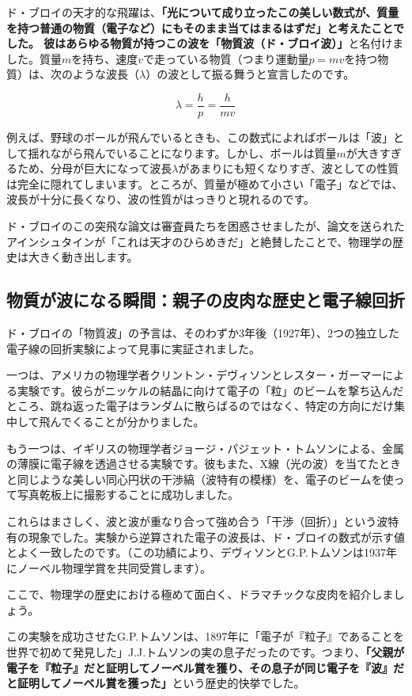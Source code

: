 ド・ブロイの天才的な飛躍は、\textbf{「光について成り立ったこの美しい数式が、質量を持つ普通の物質（電子など）にもそのまま当てはまるはずだ」と考えたことでした。 彼はあらゆる物質が持つこの波を「物質波（ド・ブロイ波）」}と名付けました。質量\(m\)を持ち、速度\(v\)で走っている物質（つまり運動量\(p=mv\)を持つ物質）は、次のような波長（\(\lambda\)）の波として振る舞うと宣言したのです。

\[\lambda = \frac{h}{p} = \frac{h}{mv}\]

例えば、野球のボールが飛んでいるときも、この数式によればボールは「波」として揺れながら飛んでいることになります。しかし、ボールは質量\(m\)が大きすぎるため、分母が巨大になって波長\(\lambda\)があまりにも短くなりすぎ、波としての性質は完全に隠れてしまいます。ところが、質量が極めて小さい「電子」などでは、波長が十分に長くなり、波の性質がはっきりと現れるのです。

ド・ブロイのこの突飛な論文は審査員たちを困惑させましたが、論文を送られたアインシュタインが「これは天才のひらめきだ」と絶賛したことで、物理学の歴史は大きく動き出します。

\subsection{物質が波になる瞬間：親子の皮肉な歴史と電子線回折}

ド・ブロイの「物質波」の予言は、そのわずか3年後（1927年）、2つの独立した電子線の回折実験によって見事に実証されました。

一つは、アメリカの物理学者クリントン・デヴィソンとレスター・ガーマーによる実験です。彼らがニッケルの結晶に向けて電子の「粒」のビームを撃ち込んだところ、跳ね返った電子はランダムに散らばるのではなく、特定の方向にだけ集中して飛んでくることが分かりました。

もう一つは、イギリスの物理学者ジョージ・パジェット・トムソンによる、金属の薄膜に電子線を透過させる実験です。彼もまた、X線（光の波）を当てたときと同じような美しい同心円状の干渉縞（波特有の模様）を、電子のビームを使って写真乾板上に撮影することに成功しました。

これらはまさしく、波と波が重なり合って強め合う「干渉（回折）」という波特有の現象でした。実験から逆算された電子の波長は、ド・ブロイの数式が示す値とよく一致したのです。（この功績により、デヴィソンとG.P.トムソンは1937年にノーベル物理学賞を共同受賞します）。

ここで、物理学の歴史における極めて面白く、ドラマチックな皮肉を紹介しましょう。

この実験を成功させたG.P.トムソンは、1897年に「電子が『粒子』であることを世界で初めて発見した」J.J.トムソンの実の息子だったのです。つまり、\textbf{「父親が電子を『粒子』だと証明してノーベル賞を獲り、その息子が同じ電子を『波』だと証明してノーベル賞を獲った」}という歴史的快挙でした。

